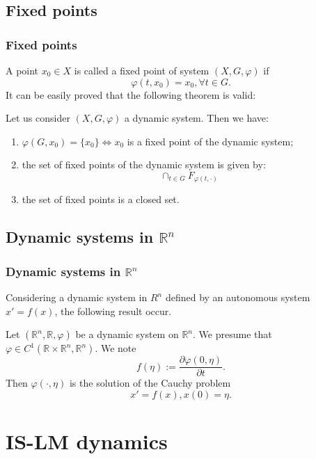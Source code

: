 \documentclass[11]{beamer}
\newcommand{\R}{\mathbb{R}}
\begin{document}
\subsection{Fixed points}
\begin{frame}
 \frametitle{Fixed points}
 A point $x_{0}\in X$ is called a fixed point of system $(X,G,\varphi)$ if $$\varphi(t,x_{0})=x_{0},\forall t\in G.$$
It can be easily proved that the following theorem is valid:
\begin{theorem}
 Let us consider $(X,G,\varphi)$ a dynamic system. Then we have:
 \begin{enumerate}
  \item $\varphi(G,x_{0})=\{x_{0}\} \Leftrightarrow x_{0}$ is a fixed point of the dynamic system;
  \item the set of fixed points of the dynamic system is given by: $$\cap_{t\in G} F_{\varphi(t,\cdot)}$$
  \item the set of fixed points is a closed set.
 \end{enumerate}

\end{theorem}
\end{frame}
\subsection{Dynamic systems in $\R^{n}$}
\begin{frame}
 \frametitle{Dynamic systems in $\R^{n}$}
 Considering a dynamic system in $R^{n}$ defined by an autonomous system $x'=f(x)$, the following result occur.
 \begin{theorem}
  Let $(\R^{n},\R,\varphi)$ be a dynamic system on $\R^{n}$. We presume that $\varphi\in C^{1}(\R\times\R^{n},\R^{n})$. We note $$f(\eta):=\frac{\partial \varphi(0,\eta)}{\partial t}.$$ Then $\varphi(\cdot,\eta)$ is the solution of the Cauchy problem 
  \begin{equation}\label{1.14}
   x'=f(x),x(0)=\eta.
  \end{equation}

 \end{theorem}
 \end{frame}
 
\section{IS-LM dynamics}
\end{document}

